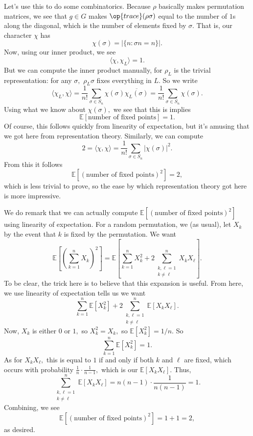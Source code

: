 Let's use this to do some combinatorics. Because $\rho$ basically makes permutation matrices, we see that $g\in G$ makes $\op{trace}(\rho\sigma)$ equal to the number of $1$s along the diagonal, which is the number of elements fixed by $\sigma.$ That is, our character $\chi$ has
\[\chi(\sigma)=|\{n:\sigma n=n\}|.\]
Now, using our inner product, we see
\[\langle\chi,\chi_L\rangle=1.\]
But we can compute the inner product manually, for $\rho_L$ is the trivial representation: for any $\sigma,$ $\rho_L\sigma$ fixes everything in $L.$ So we write
\[\langle\chi_L,\chi\rangle=\frac1{n!}\sum_{\sigma\in S_n}\chi(\sigma)\overline{\chi_L(\sigma)}=\frac1{n!}\sum_{\sigma\in S_n}\chi(\sigma).\]
Using what we know about $\chi(\sigma),$ we see that this is implies
\[\mathbb E[\text{number of fixed points}]=1.\]
Of course, this follows quickly from linearity of expectation, but it's amusing that we got here from representation theory. Similarly, we can compute
\[2=\langle\chi,\chi\rangle=\frac1{n!}\sum_{\sigma\in S_n}|\chi(\sigma)|^2.\]
From this it follows
\[\mathbb E\left[(\text{number of fixed points})^2\right]=2,\]
which is less trivial to prove, so the ease by which representation theory got here is more impressive.

We do remark that we can actually compute $\mathbb E\left[(\text{number of fixed points})^2\right]$ using linearity of expectation. For a random permutation, we (as usual), let $X_k$ by the event that $k$ is fixed by the permutation. We want
\[\mathbb E\left[\left(\sum_{k=1}^nX_k\right)^2\right]=\mathbb E\left[\sum_{k=1}^nX_k^2+2\sum_{\substack{k,\ell=1\\k\ne\ell}}^nX_kX_\ell\right].\]
To be clear, the trick here is to believe that this expansion is useful. From here, we use linearity of expectation tells us we want
\[\sum_{k=1}^n\mathbb E\left[X_k^2\right]+2\sum_{\substack{k,\ell=1\\k\ne\ell}}^n\mathbb E[X_kX_\ell].\]
Now, $X_k$ is either $0$ or $1,$ so $X_k^2=X_k,$ so $\mathbb E[X_k^2]=1/n.$ So
\[\sum_{k=1}^n\mathbb E\left[X_k^2\right]=1.\]
As for $X_kX_\ell,$ this is equal to $1$ if and only if both $k$ and $\ell$ are fixed, which occurs with probability $\frac1n\cdot\frac1{n-1},$ which is our $\mathbb E[X_kX_\ell].$ Thus,
\[\sum_{\substack{k,\ell=1\\k\ne\ell}}^n\mathbb E[X_kX_\ell]=n(n-1)\cdot\frac1{n(n-1)}=1.\]
Combining, we see
\[\mathbb E\left[(\text{number of fixed points})^2\right]=1+1=2,\]
as desired.

